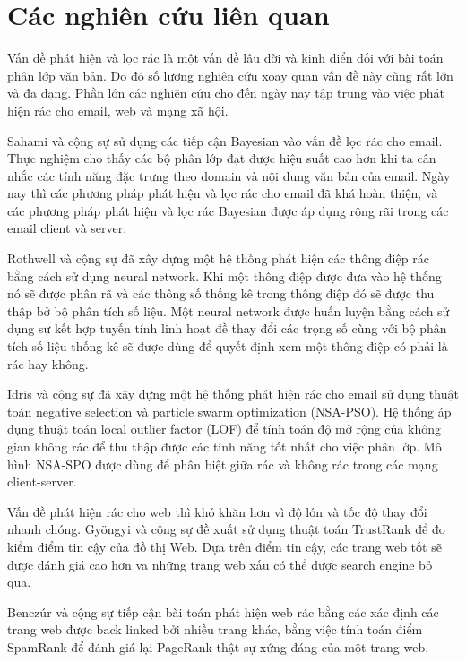 \section{Các nghiên cứu liên quan}
Vấn đề phát hiện và lọc rác là một vấn đề lâu đời và kinh điển đối với bài toán phân lớp văn bản. Do đó số lượng nghiên cứu xoay quan vấn đề này cũng rất lớn và đa dạng. Phần lớn các nghiên cứu cho đến ngày nay tập trung vào việc phát hiện rác cho email, web và mạng xã hội. 

Sahami và cộng sự \cite{Sahami1998ABA} sử dụng các tiếp cận Bayesian vào vấn đề lọc rác cho email. Thực nghiệm cho thấy các bộ phân lớp đạt được hiệu suất cao hơn khi ta cân nhắc các tính năng đặc trưng theo domain và nội dung văn bản của email. Ngày nay thì các phương pháp phát hiện và lọc rác cho email đã khá hoàn thiện, và các phương pháp phát hiện và lọc rác Bayesian được áp dụng rộng rãi trong các email client và server.

Rothwell và cộng sự\cite{rothwell2004intelligent} đã xây dựng một hệ thống phát hiện các thông điệp rác bằng cách sử dụng neural network. Khi một thông điệp được đưa vào hệ thống nó sẽ được phân rã và các thông số thống kê trong thông điệp đó sẽ được thu thập bở bộ phân tích số liệu. Một neural network được huấn luyện bằng cách sử dụng sự kết hợp tuyến tính linh hoạt đề thay đổi các trọng số cùng với bộ phân tích số liệu thống kê sẽ được dùng để quyết định xem một thông điệp có phải là rác hay không.  

Idris và cộng sự\cite{IDRIS201533} đã xây dựng một hệ thống phát hiện rác cho email sử dụng thuật toán negative selection và particle swarm optimization (NSA-PSO). Hệ thống áp dụng thuật toán local outlier factor (LOF) để tính toán độ mở rộng của không gian không rác để thu thập được các tính năng tốt nhất cho việc phân lớp. Mô hình NSA-SPO được dùng để phân biệt giữa rác và không rác trong các mạng client-server.

Vấn đề phát hiện rác cho web thì khó khăn hơn vì độ lớn và tốc độ thay đổi nhanh chóng. Gy\"{o}ngyi và cộng sự \cite{Gyongyi:2004:CWS:1316689.1316740} đề xuất sử dụng thuật toán TrustRank để đo kiểm điểm tin cậy của đồ thị Web. Dựa trên điểm tin cậy, các trang web tốt sẽ được đánh giá cao hơn va những trang web xấu có thể được search engine bỏ qua. 

Benczúr và cộng sự\cite{benczur} tiếp cận bài toán phát hiện web rác bằng các xác định các trang web được back linked bởi nhiều trang khác, bằng việc tính toán điểm SpamRank để đánh giá lại PageRank thật sự xứng đáng của một trang web. 

